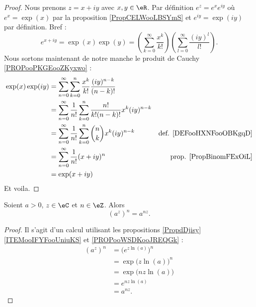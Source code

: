 \begin{proof}
	Nous prenons \( z=x+iy\) avec \( x,y\in \eR\). Par définition \( e^z=e^xe^{iy}\) où \( e^x=\exp(x)\) par la proposition \ref{PropCELWooLBSYmS} et \( e^{iy}=\exp(iy)\) par définition. Bref :
	\begin{equation}
		e^{x+iy}=\exp(x)\exp(y)=\left( \sum_{k=0}^{\infty}\frac{ x^k }{ k! } \right)\left( \sum_{l=0}^{\infty}\frac{ (iy)^l }{ l! } \right).
	\end{equation}
	Nous sortons maintenant de notre manche le produit de Cauchy \ref{PROPooPKGEooZKyxwo} :
	\begin{subequations}
		\begin{align}
			\exp(x)\exp(iy) & =\sum_{n=0}^{\infty}\sum_{k=0}^n\frac{ x^k }{ k! }\frac{ (iy)^{n-k} }{ (n-k)! }                                         \\
			                & =\sum_{n=0}^{\infty}\frac{1}{ n!}\sum_{k=0}^n\frac{ n! }{ k!(n-k)! }x^k(iy)^{n-k}                                       \\
			                & =\sum_{n=0}^{\infty}\frac{1}{ n!}\sum_{k=0}^n\binom{ n }{ k }x^k(iy)^{n-k}        & \text{def. \ref{DEFooHXNFooOBKgqD}} \\
			                & =\sum_{n=0}^{\infty}\frac{1}{ n!}(x+iy)^n                                         & \text{prop. \ref{PropBinomFExOiL}}  \\
			                & =\exp(x+iy)
		\end{align}
	\end{subequations}
	Et voila.
\end{proof}


\begin{lemma}        \label{LEMooTDGKooWdpUTD}	%
	Soient \( a>0\), \( z\in \eC\) et \( n\in \eZ\). Alors
	\begin{equation}
		(a^z)^n=a^{nz}.
	\end{equation}
\end{lemma}

\begin{proof}
	Il s'agit d'un calcul utilisant les propositions \ref{PropdDjisy}\ref{ITEMooIFYFooUniuKS} et \ref{PROPooWSDKooJREQGk} :
	\begin{subequations}
		\begin{align}
			(a^z)^n & =\big(  e^{z\ln(a)} \big)^n \\
			        & =\exp\big( z\ln(a) \big)^n  \\
			        & =\exp\big( nz\ln(a) \big)   \\
			        & = e^{nz\ln(a)}              \\
			        & =a^{nz}.
		\end{align}
	\end{subequations}
\end{proof}

